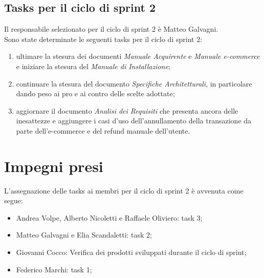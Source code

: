 \documentclass[a4paper, 12pt]{article}
\begin{document}
\subsection{Tasks per il ciclo di sprint 2}
Il responsabile selezionato per il ciclo di sprint 2 è Matteo Galvagni. \\
Sono state determinate le seguenti tasks per il ciclo di sprint 2:
\begin{enumerate}
	\item ultimare la stesura dei documenti \textit{Manuale Acquirente} e \textit{Manuale e-commerce} e iniziare la stesura del \textit{Manuale di Installazione};
	\item continuare la stesura del documento \textit{Specifiche Architetturali}, in particolare dando peso ai pro e ai contro delle scelte adottate;
	\item aggiornare il documento \textit{Analisi dei Requisiti} che presenta ancora delle inesattezze e aggiungere i casi d'uso dell'annullamento della transazione da parte dell'e-commerce e del refund manuale dell'utente.
\end{enumerate}

\section{Impegni presi}
L'assegnazione delle tasks ai membri per il ciclo di sprint 2 è avvenuta come segue:
\begin{itemize}
	\item Andrea Volpe, Alberto Nicoletti e Raffaele Oliviero: task 3;
	\item Matteo Galvagni e Elia Scandaletti: task 2;
	\item Giovanni Cocco: Verifica dei prodotti sviluppati durante il ciclo di sprint;
	\item Federico Marchi: task 1;
\end{itemize}
\end{document}
